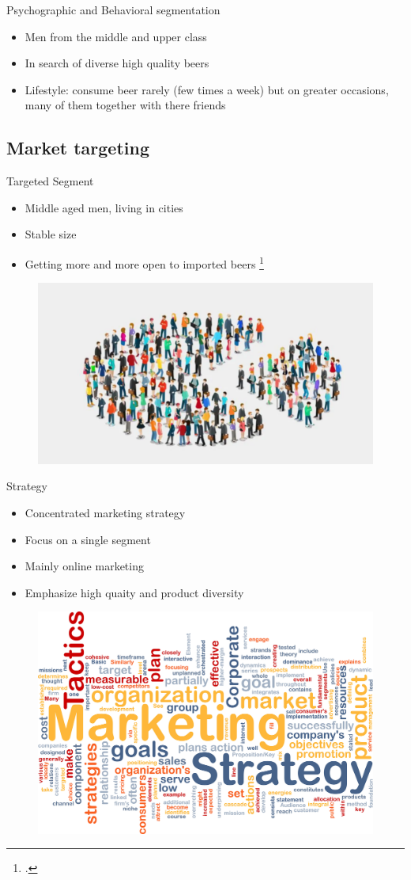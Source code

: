 \documentclass[aspectratio=43]{beamer}
\begin{document}
\begin{frame}{Psychographic and Behavioral segmentation}
   \begin{itemize}
      \item Men from the middle and upper class
      \item In search of diverse high quality beers
      \item Lifestyle: consume beer rarely (few times a week) but on greater occasions, many of them together with there friends
   \end{itemize}
\end{frame}



\subsection{Market targeting}
\begin{frame}{Targeted Segment}
\begin{itemize}
   \item Middle aged men, living in cities
   \item Stable size
   \item Getting more and more open to imported beers \footcite{ksh2}
\end{itemize}
\begin{figure}[H]
  \centering
  \includegraphics[width=0.64\linewidth]{pics/bullshit2.png}
\end{figure}
\end{frame}

\begin{frame}{Strategy}
\begin{itemize}
   \item Concentrated marketing strategy
   \item Focus on a single segment
   \item Mainly online marketing
   \item Emphasize high quaity and product diversity
\end{itemize}
\begin{figure}[H]
  \centering
  \includegraphics[width=0.57\linewidth]{pics/bullshit1.jpg}
\end{figure}
\end{frame}
\end{document}
